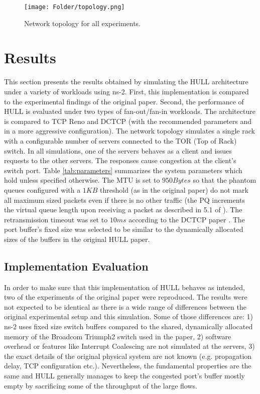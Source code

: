 \documentclass[10pt,conference,compsocconf]{IEEEtran}
\begin{document}
\begin{figure}[ht]
    \centering
    \texttt{[image: Folder/topology.png]}
    \setlength{\belowcaptionskip}{-0.4cm}
    \caption{Network topology for all experiments.}  
    \label{fig:topology}
\end{figure} 

\section{Results}
This section presents the results obtained by simulating the HULL architecture under a variety of workloads using ns-2. First, this implementation is compared to the experimental findings of the original paper. Second, the performance of HULL is evaluated under two types of fan-out/fan-in workloads. The architecture is compared to TCP Reno and DCTCP (with the recommended parameters and in a more aggressive configuration). The network topology simulates a single rack with a configurable number of servers connected to the TOR (Top of Rack) switch. In all simulations, one of the servers behaves as a client and issues requests to the other servers. The responses cause congestion at the client's switch port. Table \ref{tab:parameters} summarizes the system parameters which hold unless specified otherwise. The MTU is set to $950Bytes$ so that the phantom queues configured with a $1KB$ threshold (as in the original paper) do not mark all maximum sized packets even if there is no other traffic (the PQ increments the virtual queue length upon receiving a packet as described in 5.1 of \cite{HULL}). The retransmission timeout was set to $10ms$ according to the DCTCP paper \cite{DCTCP}. The port buffer's fixed size was selected to be similar to the dynamically allocated sizes of the buffers in the original HULL paper.









\subsection{Implementation Evaluation} 
In order to make sure that this implementation of HULL behaves as intended, two of the experiments of the original paper were reproduced. The results were not expected to be identical as there is a wide range of differences between the original experimental setup and this simulation. Some of those differences are: 1) ns-2 uses fixed size switch buffers compared to the shared, dynamically allocated memory of the Broadcom Triumph2 switch used in the paper, 2) software overhead or features like Interrupt Coalescing are not simulated at the servers, 3) the exact details of the original physical system are not known (e.g. propagation delay, TCP configuration etc.). Nevertheless, the fundamental properties are the same and HULL generally manages to keep the congested port's buffer mostly empty by sacrificing some of the throughput of the large flows.
\end{document}
